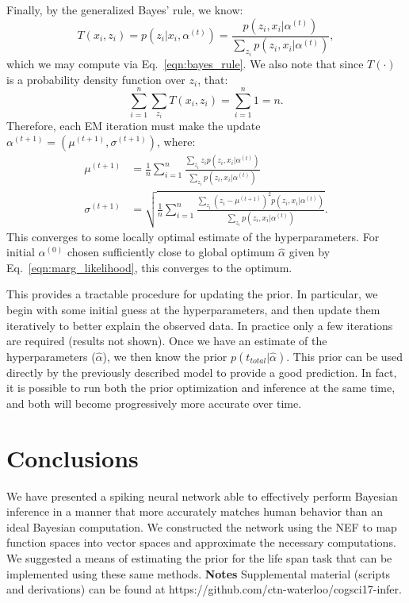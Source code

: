 \documentclass[10pt,letterpaper]{article}
\begin{document}
Finally, by the generalized Bayes' rule, we know:
$$
T(x_i, z_i) = p(z_i | x_i, \alpha^{(t)}) = \frac{p(z_i, x_i | \alpha^{(t)})}{ \sum_{z_i} p(z_i, x_i | \alpha^{(t)}) } ,
$$
which we may compute via Eq.~\ref{eqn:bayes_rule}.
We also note that since $T(\cdot)$ is a probability density function over $z_i$, that:
$$
\sum_{i=1}^n \sum_{z_i} T(x_i, z_i) = \sum_{i=1}^n 1 = n .
$$
Therefore, each EM iteration must make the update $\alpha^{(t+1)} = (\mu^{(t+1)}, \sigma^{(t+1)})$, where:
\begin{equation}
\begin{aligned}
\mu^{(t+1)} &= \frac{1}{n} \sum_{i=1}^n \frac{\sum_{z_i} z_i p(z_i, x_i | \alpha^{(t)})}{\sum_{z_i} p(z_i, x_i | \alpha^{(t)})} \\
\sigma^{(t+1)} &= \sqrt{\frac{1}{n}  \sum_{i=1}^n \frac{\sum_{z_i} (z_i - \mu^{(t+1)})^2 p(z_i, x_i | \alpha^{(t)})}{\sum_{z_i} p(z_i, x_i | \alpha^{(t)})}} .
\end{aligned}
\end{equation}
This converges to some locally optimal estimate of the hyperparameters. For initial $\alpha^{(0)}$ chosen sufficiently close to global optimum $\hat{\alpha}$ given by Eq.~\ref{eqn:marg_likelihood}, this converges to the optimum.

This provides a tractable procedure for updating the prior. In particular, we begin with some initial guess at the hyperparameters, and then update them iteratively to better explain the observed data. In practice only a few iterations are required (results not shown). Once we have an estimate of the hyperparameters ($\hat{\alpha}$), we then know the prior $p(t_{total} | \hat{\alpha})$. This prior can be used directly by the previously described model to provide a good prediction. In fact, it is possible to run both the prior optimization and inference at the same time, and both will become progressively more accurate over time.

\section{Conclusions}

We have presented a spiking neural network able to effectively perform Bayesian inference in a manner that more accurately matches human behavior than an ideal Bayesian computation.  We constructed the network using the NEF to map function spaces into vector spaces and approximate the necessary computations.  We suggested a means of estimating the prior for the life span task that can be implemented using these same methods. 
\newline \textbf{Notes} \hspace{0.3cm} Supplemental material (scripts and derivations) can be found at https://github.com/ctn-waterloo/cogsci17-infer.
\end{document}
